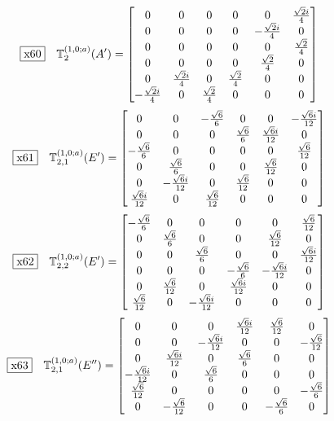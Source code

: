 \documentclass[fleqn,10pt,landscape]{jsarticle}
\begin{document}
\begin{dmath*}
\fbox{x60}\quad \mathbb{T}_{2}^{(1,0;a)}(A^{\prime})=\begin{bmatrix} 0 & 0 & 0 & 0 & 0 & \frac{\sqrt{2} i}{4} \\ 0 & 0 & 0 & 0 & - \frac{\sqrt{2} i}{4} & 0 \\ 0 & 0 & 0 & 0 & 0 & \frac{\sqrt{2}}{4} \\ 0 & 0 & 0 & 0 & \frac{\sqrt{2}}{4} & 0 \\ 0 & \frac{\sqrt{2} i}{4} & 0 & \frac{\sqrt{2}}{4} & 0 & 0 \\ - \frac{\sqrt{2} i}{4} & 0 & \frac{\sqrt{2}}{4} & 0 & 0 & 0 \end{bmatrix}
\end{dmath*}
\begin{dmath*}
\fbox{x61}\quad \mathbb{T}_{2,1}^{(1,0;a)}(E^{\prime})=\begin{bmatrix} 0 & 0 & - \frac{\sqrt{6}}{6} & 0 & 0 & - \frac{\sqrt{6} i}{12} \\ 0 & 0 & 0 & \frac{\sqrt{6}}{6} & \frac{\sqrt{6} i}{12} & 0 \\ - \frac{\sqrt{6}}{6} & 0 & 0 & 0 & 0 & \frac{\sqrt{6}}{12} \\ 0 & \frac{\sqrt{6}}{6} & 0 & 0 & \frac{\sqrt{6}}{12} & 0 \\ 0 & - \frac{\sqrt{6} i}{12} & 0 & \frac{\sqrt{6}}{12} & 0 & 0 \\ \frac{\sqrt{6} i}{12} & 0 & \frac{\sqrt{6}}{12} & 0 & 0 & 0 \end{bmatrix}
\end{dmath*}
\begin{dmath*}
\fbox{x62}\quad \mathbb{T}_{2,2}^{(1,0;a)}(E^{\prime})=\begin{bmatrix} - \frac{\sqrt{6}}{6} & 0 & 0 & 0 & 0 & \frac{\sqrt{6}}{12} \\ 0 & \frac{\sqrt{6}}{6} & 0 & 0 & \frac{\sqrt{6}}{12} & 0 \\ 0 & 0 & \frac{\sqrt{6}}{6} & 0 & 0 & \frac{\sqrt{6} i}{12} \\ 0 & 0 & 0 & - \frac{\sqrt{6}}{6} & - \frac{\sqrt{6} i}{12} & 0 \\ 0 & \frac{\sqrt{6}}{12} & 0 & \frac{\sqrt{6} i}{12} & 0 & 0 \\ \frac{\sqrt{6}}{12} & 0 & - \frac{\sqrt{6} i}{12} & 0 & 0 & 0 \end{bmatrix}
\end{dmath*}
\begin{dmath*}
\fbox{x63}\quad \mathbb{T}_{2,1}^{(1,0;a)}(E^{\prime\prime})=\begin{bmatrix} 0 & 0 & 0 & \frac{\sqrt{6} i}{12} & \frac{\sqrt{6}}{12} & 0 \\ 0 & 0 & - \frac{\sqrt{6} i}{12} & 0 & 0 & - \frac{\sqrt{6}}{12} \\ 0 & \frac{\sqrt{6} i}{12} & 0 & \frac{\sqrt{6}}{6} & 0 & 0 \\ - \frac{\sqrt{6} i}{12} & 0 & \frac{\sqrt{6}}{6} & 0 & 0 & 0 \\ \frac{\sqrt{6}}{12} & 0 & 0 & 0 & 0 & - \frac{\sqrt{6}}{6} \\ 0 & - \frac{\sqrt{6}}{12} & 0 & 0 & - \frac{\sqrt{6}}{6} & 0 \end{bmatrix}
\end{dmath*}
\end{document}

